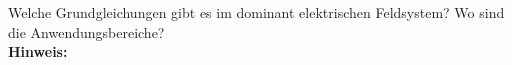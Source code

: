 \begin{question}[section=3,subsection=31,name={Dominant Elektrisch},difficulty=7,type=mdl,mode=exm,tags={}]
	Welche Grundgleichungen gibt es im dominant elektrischen Feldsystem? Wo sind die Anwendungsbereiche?
	\\ \textbf{Hinweis:}\\
	
\end{question}
\begin{solution}
	
\end{solution}